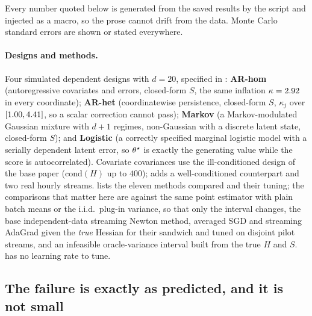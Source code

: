 Every number quoted below is generated from the saved results by the script
 and injected as a macro, so the prose cannot drift from the data. Monte Carlo standard errors are
shown or stated everywhere.

\paragraph{Designs and methods.}
Four simulated dependent designs with $d=20$, specified in : \textbf{AR-hom}
(autoregressive covariates and errors, closed-form $S$, the same inflation $\kappa=2.92$ in every
coordinate); \textbf{AR-het} (coordinatewise persistence, closed-form $S$, $\kappa_j$ over
$[1.00,4.41]$, so a scalar correction cannot pass); \textbf{Markov} (a Markov-modulated
Gaussian mixture with $d+1$ regimes, non-Gaussian with a discrete latent state, closed-form $S$); and
\textbf{Logistic} (a correctly specified marginal logistic model with a serially dependent latent error, so
$\theta^\star$ is exactly the generating value while the score is autocorrelated). Covariate covariances use the
ill-conditioned design of the base paper ($\mathrm{cond}(H)$ up to $400$);  adds a
well-conditioned counterpart and  two real hourly streams.  lists the
eleven methods compared and their tuning; the comparisons that matter here are against the same point
estimator with plain batch means or the i.i.d.\ plug-in variance, so that only the interval changes, the
base independent-data streaming Newton method, averaged SGD and streaming AdaGrad given the \emph{true}
Hessian for their sandwich and tuned on disjoint pilot streams, and an infeasible oracle-variance interval
built from the true $H$ and $S$. \bgsn{} has no learning rate to tune.

\subsection{The failure is exactly as predicted, and it is not small}

